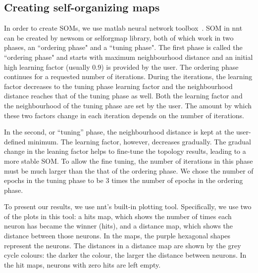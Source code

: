 \subsection{Creating self-organizing maps}
\label{sec: create_som}
     In order to create SOMs, we use {\sc matlab} neural network toolbox~\citep[NNT,][]{matlabtolbox}.
     SOM in {\sc nnt} can be created by {\sc newsom} or {\sc selforgmap} library, both of which work in two phases, an ``ordering phase" and a ``tuning phase". 
     The first phase is called the ``ordering phase" and
     starts with maximum neighbourhood distance and an initial high learning factor (usually 0.9) is provided by the user. 
     The ordering phase continues for a requested number of iterations.
     During the iterations, the learning factor decreases to the tuning phase learning factor and the neighbourhood distance reaches that of the tuning phase as well.
     Both the learning factor and the neighbourhood of the tuning phase are set by the user. 
     The amount by which these two factors change in each iteration depends on the number of iterations.
     
     In the second, or ``tuning'' phase,
     the neighbourhood distance is kept at the user-defined minimum.
     The learning factor, however, decreases gradually.
     The gradual change in the leaning factor helps to fine-tune the topology results, leading to a more stable SOM. 
     To allow the fine tuning, the number of iterations in this phase must be much larger than the that of the ordering phase. %
     We chose the number of epochs in the tuning phase to be 3 times the number of epochs in the ordering phase.
     
     To present our results, we use {\sc nnt}'s built-in plotting tool.
     Specifically, we use two of the plots in this tool: a hits map, which shows the number of times each neuron has became the winner (hits), and a distance map, which shows the distance between those neurons.
     In the maps, the purple hexagonal shapes represent the neurons. 
     The distances in a distance map are shown by the grey cycle colours:
     the darker the colour, the larger the distance between neurons.
     In the hit maps, neurons with zero hits are left empty.
      
